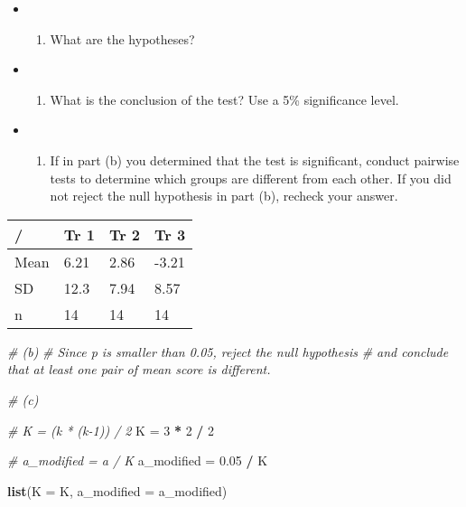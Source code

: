 \documentclass[]{book}
\newenvironment{Shaded}{\begin{snugshade}}{\end{snugshade}}
\newcommand{\CommentTok}[1]{\textcolor[rgb]{0.56,0.35,0.01}{\textit{#1}}}
\newcommand{\DataTypeTok}[1]{\textcolor[rgb]{0.13,0.29,0.53}{#1}}
\newcommand{\DecValTok}[1]{\textcolor[rgb]{0.00,0.00,0.81}{#1}}
\newcommand{\FloatTok}[1]{\textcolor[rgb]{0.00,0.00,0.81}{#1}}
\newcommand{\KeywordTok}[1]{\textcolor[rgb]{0.13,0.29,0.53}{\textbf{#1}}}
\newcommand{\NormalTok}[1]{#1}
\newcommand{\OperatorTok}[1]{\textcolor[rgb]{0.81,0.36,0.00}{\textbf{#1}}}
\newcommand{\StringTok}[1]{\textcolor[rgb]{0.31,0.60,0.02}{#1}}
\providecommand{\tightlist}{%
  \setlength{\itemsep}{0pt}\setlength{\parskip}{0pt}}
\begin{document}
\begin{itemize}
\item
  \begin{enumerate}
  \def\labelenumi{(\alph{enumi})}
  \tightlist
  \item
    What are the hypotheses?
  \end{enumerate}
\item
  \begin{enumerate}
  \def\labelenumi{(\alph{enumi})}
  \setcounter{enumi}{1}
  \tightlist
  \item
    What is the conclusion of the test? Use a 5\% significance level.
  \end{enumerate}
\item
  \begin{enumerate}
  \def\labelenumi{(\alph{enumi})}
  \setcounter{enumi}{2}
  \tightlist
  \item
    If in part (b) you determined that the test is significant, conduct pairwise tests to determine which groups are different from each other. If you did not reject the null hypothesis in part (b), recheck your answer.
  \end{enumerate}
\end{itemize}

\begin{longtable}[]{@{}llll@{}}
\toprule
/ & Tr 1 & Tr 2 & Tr 3\tabularnewline
\midrule
\endhead
Mean & 6.21 & 2.86 & -3.21\tabularnewline
SD & 12.3 & 7.94 & 8.57\tabularnewline
n & 14 & 14 & 14\tabularnewline
\bottomrule
\end{longtable}

\begin{Shaded}
\begin{Highlighting}[]
\CommentTok{# (b)}
\CommentTok{# Since p is smaller than 0.05, reject the null hypothesis}
\CommentTok{# and conclude that at least one pair of mean score is different.}
\end{Highlighting}
\end{Shaded}

\begin{Shaded}
\begin{Highlighting}[]
\CommentTok{# (c)}

\CommentTok{# K = (k * (k-1)) / 2}
\NormalTok{K =}\StringTok{ }\DecValTok{3} \OperatorTok{*}\StringTok{ }\DecValTok{2} \OperatorTok{/}\StringTok{ }\DecValTok{2}

\CommentTok{# a_modified = a / K}
\NormalTok{a_modified =}\StringTok{ }\FloatTok{0.05} \OperatorTok{/}\StringTok{ }\NormalTok{K}

\KeywordTok{list}\NormalTok{(}\DataTypeTok{K =}\NormalTok{ K, }\DataTypeTok{a_modified =}\NormalTok{ a_modified)}
\end{Highlighting}
\end{Shaded}
\end{document}

